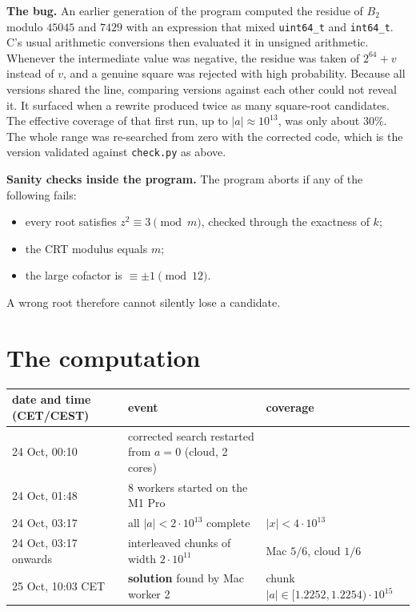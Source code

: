 \documentclass[11pt]{article}
\theoremstyle{remark}
\theoremstyle{definition}
\begin{document}
\textbf{The bug.}  An earlier generation of the program computed the residue of $B_2$ modulo
$45045$ and $7429$ with an expression that mixed \texttt{uint64\_t} and \texttt{int64\_t}.  C's usual
arithmetic conversions then evaluated it in unsigned arithmetic.  Whenever the intermediate value
was negative, the residue was taken of $2^{64}+v$ instead of $v$, and a genuine square was rejected
with high probability.  Because all versions shared the line, comparing versions against each
other could not reveal it.  It surfaced when a rewrite produced twice as many
square-root candidates.  The effective coverage of that first run, up to $|a|\approx10^{13}$, was
only about $30\%$.  The whole range was re-searched from zero with the corrected code, which is the
version validated against \texttt{check.py} as above.

\textbf{Sanity checks inside the program.}  The program aborts if any of the following fails:
\begin{itemize}
\item every root satisfies $z^2\equiv3\pmod m$, checked through the exactness of $k$;
\item the CRT modulus equals $m$;
\item the large cofactor is $\equiv\pm1\pmod{12}$.
\end{itemize}
A wrong root therefore cannot silently lose a candidate.

\section{The computation}\label{sec:computation}

\begin{center}
\small
\begin{tabular}{p{}p{}p{}}
\toprule
date and time (CET/CEST) & event & coverage\\\midrule
24 Oct, 00:10 & corrected search restarted from $a=0$ (cloud, 2 cores) & \\
24 Oct, 01:48 & 8 workers started on the M1 Pro & \\
24 Oct, 03:17 & all $|a|<2\cdot10^{13}$ complete & $|x|<4\cdot10^{13}$\\
24 Oct, 03:17 onwards & interleaved chunks of width $2\cdot10^{11}$ & Mac $5/6$, cloud $1/6$\\
25 Oct, 10:03 CET & \textbf{solution} found by Mac worker 2 & chunk $|a|\in[1.2252,1.2254)\cdot10^{15}$\\
\bottomrule
\end{tabular}
\end{center}
\end{document}
